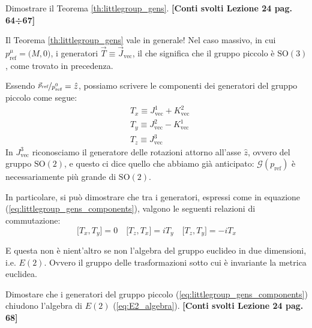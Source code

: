 \documentclass[../main.tex]{subfiles}
\begin{document}
\begin{exercise}
    Dimostrare il Teorema \ref{th:littlegroup_gens}. \textbf{[Conti svolti Lezione 24 pag. 64÷67]}
\end{exercise}

\begin{nota}
    Il Teorema \ref{th:littlegroup_gens} vale in generale! Nel caso massivo, in cui $p^\mu_\text{ref} = \big(M,0\big)$, i generatori $\Vec{T}\equiv\Vec{J}_\mathrm{vec}$, il che significa che il gruppo piccolo è $\text{SO}(3)$, come trovato in precedenza.  
\end{nota}

Essendo \(\nicefrac{\Vec{p}_\mathrm{ref}}{p^0_\mathrm{ref}} = \hat{z}\), possiamo scrivere le componenti dei generatori del gruppo piccolo come segue:
\begin{equation}
    \begin{aligned}
        &T_x \equiv  J^1_\mathrm{vec} + K^2_\mathrm{vec}\\
        &T_y \equiv  J^2_\mathrm{vec} - K^1_\mathrm{vec}\\
        &T_z \equiv  J^3_\mathrm{vec} 
    \end{aligned}
    \label{eq:littlegroup_gens_components}
\end{equation}
In $J^3_\mathrm{vec}$ riconosciamo il generatore delle rotazioni attorno all'asse $\hat{z}$, ovvero del gruppo $\text{SO}(2)$, e questo ci dice quello che abbiamo già anticipato: $\mathscr G (p_\text{ref})$ è necessariamente più grande di $\text{SO}(2)$.

In particolare, si può dimostrare che tra i generatori, espressi come in equazione (\ref{eq:littlegroup_gens_components}), valgono le seguenti relazioni di commutazione:
\begin{equation}
    \big[T_x, T_y\big] = 0 \quad \big[T_z, T_x\big] = iT_y \quad \big[T_z, T_y\big] = -iT_x
    \label{eq:E2_algebra}
\end{equation}

E questa non è nient'altro se non l'algebra del gruppo euclideo in due dimensioni, i.e. $E(2)$. Ovvero il gruppo delle trasformazioni sotto cui è invariante la metrica euclidea.

\begin{exercise}
    Dimostare che i generatori del gruppo piccolo (\ref{eq:littlegroup_gens_components}) chiudono l'algebra di $E(2)$ (\ref{eq:E2_algebra}). \textbf{[Conti svolti Lezione 24 pag. 68]}
\end{exercise}
\end{document}
